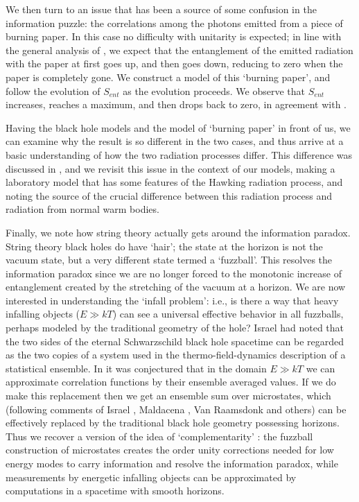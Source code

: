 \documentclass[11pt]{article}
\begin{document}
We then turn to an issue that has been a source of some confusion in the information puzzle: the correlations among the photons emitted from a piece of burning paper. In this case no difficulty with unitarity is expected; in line with the general analysis of \cite{page}, we expect that the entanglement of the emitted radiation with the paper at first goes up, and then goes down, reducing to zero when the paper is completely gone. We construct a model of this `burning paper', and follow the evolution of $S_{ent}$ as the evolution proceeds. We observe that $S_{ent}$ increases, reaches a maximum, and then drops back to zero, in agreement with \cite{page}.

Having the black hole models and the model of `burning paper' in front of us, we can examine why the result is so different in the two cases, and thus arrive at a basic understanding of how the two radiation processes differ. This difference was discussed in \cite{mathurfuzz}, and we revisit this issue in the context of our models, making a laboratory model that has some features of the Hawking radiation process, and noting the source of the crucial difference between this radiation process and radiation from normal warm bodies.  

Finally, we note how string theory actually gets around the information paradox. String theory black holes do have `hair';   the state at the horizon is not the vacuum state, but a very different state termed a `fuzzball'. This resolves the information paradox since we are no longer forced to the monotonic increase of entanglement created by the stretching of the vacuum at a horizon. We are now interested in understanding the `infall problem': i.e., is there a way that heavy infalling objects ($E\gg kT$) can see a universal effective behavior in all fuzzballs, perhaps modeled by the traditional geometry of the hole? Israel \cite{israel2} had noted that the two sides of the eternal Schwarzschild black hole  spacetime can be regarded as the two copies of a system used in the thermo-field-dynamics description \cite{umezawa} of a statistical ensemble. In \cite{mathurrecent} it was conjectured that in the domain $E\gg kT$ we can approximate  correlation functions by their ensemble averaged values. If we do make this replacement then we get an ensemble sum over microstates, which (following comments of Israel \cite{israel2}, Maldacena \cite{maldacena2}, Van Raamsdonk \cite{raamsdonk} and others) can be effectively replaced by the traditional black hole geometry possessing horizons. Thus we recover a version of the idea of `complementarity' \cite{thooft1,suss1}: the fuzzball construction of microstates creates the order unity corrections needed for low energy modes to carry information and resolve the information paradox, while measurements by energetic infalling objects can be approximated by computations in a spacetime with smooth horizons. 
 
\end{document}
